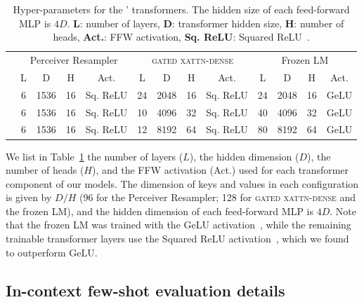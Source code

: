 \begin{table}[h]
\centering
\footnotesize
\begin{tabular}{@{}l|cccc|cccc|cccc@{}}
\toprule
                        & \multicolumn{4}{c|}{Perceiver Resampler} & \multicolumn{4}{c|}{\textsc{gated xattn-dense}}  & \multicolumn{4}{c}{Frozen LM} \\ 
                        & L & D & H  & Act. & L & D & H   & Act. & L & D & H  & Act. \\ \midrule
\base{}            &   6    &  1536  & 16 & Sq. ReLU &   24   &  2048  & 16 & Sq. ReLU & 24 &  2048 &  16  & GeLU    \\
\medium{}          &   6    &  1536  & 16 & Sq. ReLU &   10    &  4096  & 32 & Sq. ReLU & 40 &  4096 & 32 & GeLU   \\
\largem{}           &   6    &  1536  & 16 & Sq. ReLU &   12    &  8192  & 64 & Sq. ReLU & 80 &  8192 &  64 & GeLU \\ \bottomrule
\end{tabular}%
\vspace{1em}
\caption{Hyper-parameters for the \methodfamily{}' transformers. The hidden size of each feed-forward MLP is $4D$. \textbf{L}: number of layers, \textbf{D}: transformer hidden size, \textbf{H}: number of heads, \textbf{Act.}: FFW activation, \textbf{Sq. ReLU}: Squared ReLU~\citep{so2021primer}.
}
\label{tab:model-architecture-hyperparam}
\end{table}

We list in Table~\ref{tab:model-architecture-hyperparam} the number of layers ($L$), the hidden dimension ($D$), the number of heads ($H$), and the FFW activation (Act.) used for each transformer component of our \method{} models.
The dimension of keys and values in each configuration is given by $D/H$ (96 for the Perceiver Resampler; 128 for \textsc{gated xattn-dense} and the frozen LM),
and the hidden dimension of each feed-forward MLP is $4D$.
Note that the frozen LM was trained with the GeLU activation~\citep{hendrycks2016gaussian}, while the remaining trainable transformer layers use the Squared ReLU activation~\citep{so2021primer}, which we found to outperform GeLU.




\subsection{In-context few-shot evaluation details}
\label{app:in_context_eval_details}

